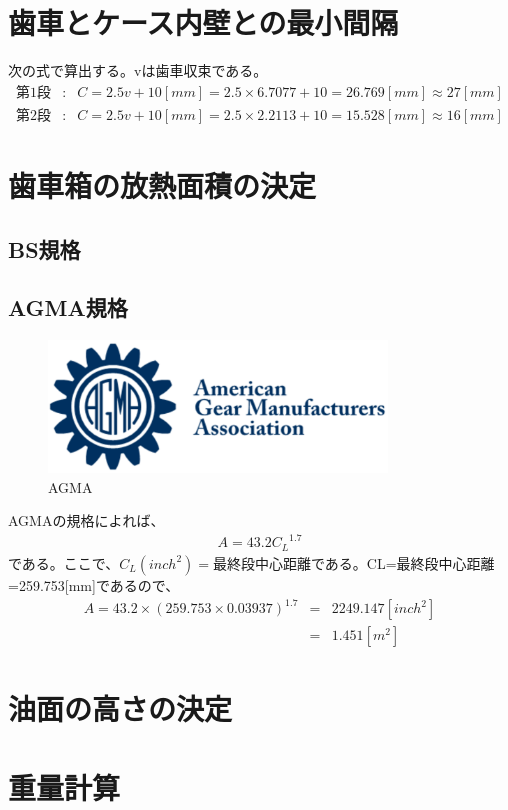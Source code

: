 \documentclass[a4j,twoside,openright,11pt]{jreport}
\begin{document}
\section{歯車とケース内壁との最小間隔}
次の式で算出する。vは歯車収束である。
\begin{eqnarray}
第1段&:&C=2.5v+10[mm] =2.5 \times 6.7077 + 10 = 26.769[mm]  \approx 27[mm]\\
第2段&:&C=2.5v+10[mm] =2.5 \times 2.2113 + 10 = 15.528[mm] \approx 16[mm]
\end{eqnarray}
\section{歯車箱の放熱面積の決定}
\subsection{BS規格}
\subsection{AGMA規格}
\begin{figure}[htbp]
\begin{center}
\includegraphics[width=9cm]{20127161210319005.eps}
\end{center}
\caption{AGMA}
\end{figure}
AGMAの規格によれば、
\begin{eqnarray}
A=43.2{C_L}^{1.7}
\end{eqnarray}
である。ここで、$C_L(inch^2)=最終段中心距離$である。CL=最終段中心距離=259.753[mm]であるので、
\begin{eqnarray}
A=43.2 \times (259.753 \times 0.03937)^{1.7} &=& 2249.147 [inch^2]\\
&=&1.451[m^2]
\end{eqnarray}

\section{油面の高さの決定}
\section{重量計算}
\end{document}
